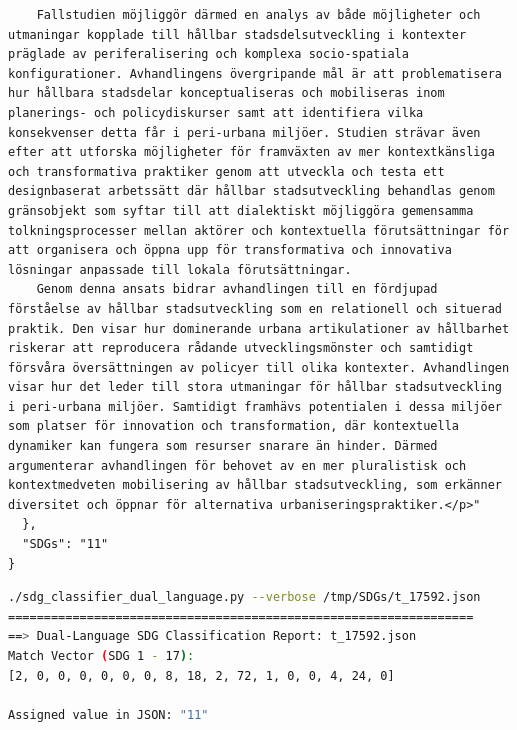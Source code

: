 \begin{casestudySection}
\begin{lstlisting}
    Fallstudien möjliggör därmed en analys av både möjligheter och utmaningar kopplade till hållbar stadsdelsutveckling i kontexter präglade av periferalisering och komplexa socio-spatiala konfigurationer. Avhandlingens övergripande mål är att problematisera hur hållbara stadsdelar konceptualiseras och mobiliseras inom planerings- och policydiskurser samt att identifiera vilka konsekvenser detta får i peri-urbana miljöer. Studien strävar även efter att utforska möjligheter för framväxten av mer kontextkänsliga och transformativa praktiker genom att utveckla och testa ett designbaserat arbetssätt där hållbar stadsutveckling behandlas genom gränsobjekt som syftar till att dialektiskt möjliggöra gemensamma tolkningsprocesser mellan aktörer och kontextuella förutsättningar för att organisera och öppna upp för transformativa och innovativa lösningar anpassade till lokala förutsättningar.
    Genom denna ansats bidrar avhandlingen till en fördjupad förståelse av hållbar stadsutveckling som en relationell och situerad praktik. Den visar hur dominerande urbana artikulationer av hållbarhet riskerar att reproducera rådande utvecklingsmönster och samtidigt försvåra översättningen av policyer till olika kontexter. Avhandlingen visar hur det leder till stora utmaningar för hållbar stadsutveckling i peri-urbana miljöer. Samtidigt framhävs potentialen i dessa miljöer som platser för innovation och transformation, där kontextuella dynamiker kan fungera som resurser snarare än hinder. Därmed argumenterar avhandlingen för behovet av en mer pluralistisk och kontextmedveten mobilisering av hållbar stadsutveckling, som erkänner diversitet och öppnar för alternativa urbaniseringspraktiker.</p>"
  },
  "SDGs": "11"
}
\end{lstlisting}

\begin{lstlisting}[language={bash}, basicstyle=\footnotesize, escapechar=|, breaklines=true,
    postbreak=\usebox{\lstbreakbox}, caption={Program's output (after expanding \gls{SDG}~16 governance vocabulary)}, label=lst:t_17592Output]
./sdg_classifier_dual_language.py --verbose /tmp/SDGs/t_17592.json
=================================================================
==> Dual-Language SDG Classification Report: t_17592.json
Match Vector (SDG 1 - 17):
[2, 0, 0, 0, 0, 0, 0, 8, 18, 2, 72, 1, 0, 0, 4, 24, 0]

Assigned value in JSON: "11"


\end{lstlisting}
\end{casestudySection}
